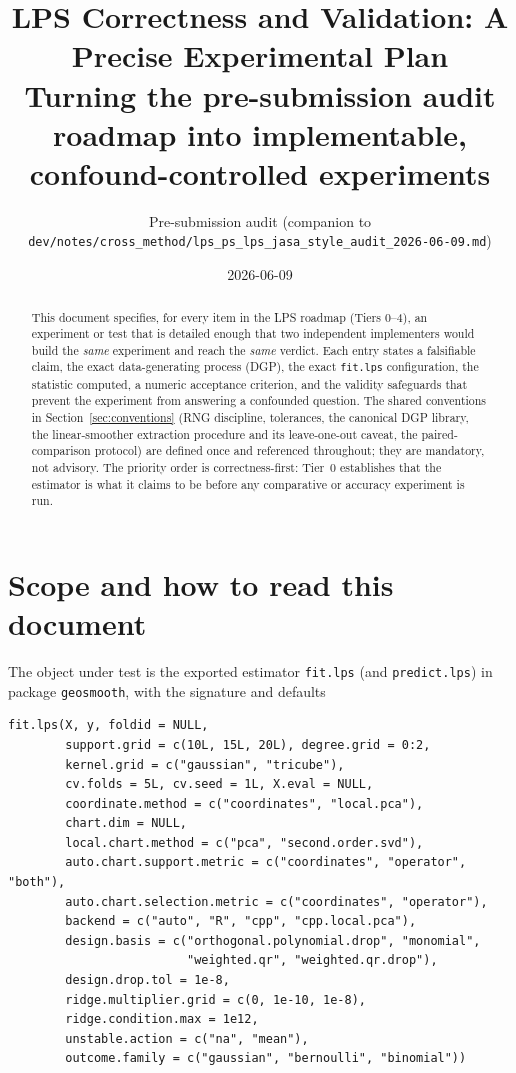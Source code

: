 \documentclass[11pt]{article}
\title{\textbf{LPS Correctness and Validation: A Precise Experimental Plan}\\[2pt]
\large Turning the pre-submission audit roadmap into implementable, confound-controlled experiments}
\author{Pre-submission audit (companion to \texttt{dev/notes/cross\_method/lps\_ps\_lps\_jasa\_style\_audit\_2026-06-09.md})}
\date{2026-06-09}
\newcommand{\code}[1]{\texttt{#1}}
\begin{document}
\maketitle

\begin{abstract}
This document specifies, for every item in the LPS roadmap (Tiers 0--4), an experiment
or test that is detailed enough that two independent implementers would build the
\emph{same} experiment and reach the \emph{same} verdict. Each entry states a falsifiable
claim, the exact data-generating process (DGP), the exact \code{fit.lps} configuration,
the statistic computed, a numeric acceptance criterion, and the validity safeguards that
prevent the experiment from answering a confounded question. The shared conventions in
Section~\ref{sec:conventions} (RNG discipline, tolerances, the canonical DGP library, the
linear-smoother extraction procedure and its leave-one-out caveat, the paired-comparison
protocol) are defined once and referenced throughout; they are mandatory, not advisory.
The priority order is correctness-first: Tier~0 establishes that the estimator is what it
claims to be before any comparative or accuracy experiment is run.
\end{abstract}

\tableofcontents

\section{Scope and how to read this document}

The object under test is the exported estimator \code{fit.lps} (and \code{predict.lps})
in package \code{geosmooth}, with the signature and defaults
\begin{lstlisting}
fit.lps(X, y, foldid = NULL,
        support.grid = c(10L, 15L, 20L), degree.grid = 0:2,
        kernel.grid = c("gaussian", "tricube"),
        cv.folds = 5L, cv.seed = 1L, X.eval = NULL,
        coordinate.method = c("coordinates", "local.pca"),
        chart.dim = NULL,
        local.chart.method = c("pca", "second.order.svd"),
        auto.chart.support.metric = c("coordinates", "operator", "both"),
        auto.chart.selection.metric = c("coordinates", "operator"),
        backend = c("auto", "R", "cpp", "cpp.local.pca"),
        design.basis = c("orthogonal.polynomial.drop", "monomial",
                         "weighted.qr", "weighted.qr.drop"),
        design.drop.tol = 1e-8,
        ridge.multiplier.grid = c(0, 1e-10, 1e-8),
        ridge.condition.max = 1e12,
        unstable.action = c("na", "mean"),
        outcome.family = c("gaussian", "bernoulli", "binomial"))
\end{lstlisting}
\end{document}
